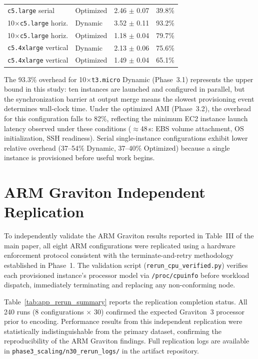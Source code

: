 \documentclass[conference]{IEEEtran}
\begin{document}
\begin{table}[!htbp]
\begin{tabular}{llcc}
\texttt{c5.large} serial          & Optimized & 2.46 $\pm$ 0.07 & 39.8\% \\
10$\times$\texttt{c5.large} horiz.& Dynamic   & 3.52 $\pm$ 0.11 & 93.2\% \\
10$\times$\texttt{c5.large} horiz.& Optimized & 1.18 $\pm$ 0.04 & 79.7\% \\
\texttt{c5.4xlarge} vertical      & Dynamic   & 2.13 $\pm$ 0.06 & 75.6\% \\
\texttt{c5.4xlarge} vertical      & Optimized & 1.49 $\pm$ 0.04 & 65.1\% \\
\bottomrule
\end{tabular}
\end{table}

The 93.3\% overhead for 10$\times$\texttt{t3.micro} Dynamic (Phase~3.1)
represents the upper bound in this study: ten instances are launched and
configured in parallel, but the synchronization barrier at output merge means
the slowest provisioning event determines wall-clock time. Under the optimized
AMI (Phase~3.2), the overhead for this configuration falls to 82\%, reflecting
the minimum EC2 instance launch latency observed under these conditions
($\approx$48\,s: EBS volume attachment, OS initialization, SSH readiness).
Serial single-instance configurations exhibit lower relative overhead
(37--54\% Dynamic, 37--40\% Optimized) because a single instance is
provisioned before useful work begins.

\section{ARM Graviton Independent Replication}
\label{app:rerun}

To independently validate the ARM Graviton results reported in Table~III of the
main paper, all eight ARM configurations were replicated using a hardware
enforcement protocol consistent with the terminate-and-retry methodology
established in Phase~1. The validation script (\texttt{rerun\_cpu\_verified.py})
verifies each provisioned instance's processor model via \texttt{/proc/cpuinfo}
before workload dispatch, immediately terminating and replacing any
non-conforming node.

Table~\ref{tab:app_rerun_summary} reports the replication completion status.
All 240 runs (8 configurations $\times$ 30) confirmed the expected Graviton~3
processor prior to encoding. Performance results from this independent
replication were statistically indistinguishable from the primary dataset,
confirming the reproducibility of the ARM Graviton findings. Full replication
logs are available in \texttt{phase3\_scaling/n30\_rerun\_logs/} in the
artifact repository.
\end{document}
